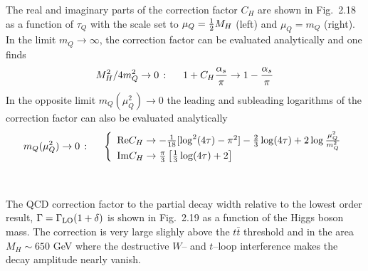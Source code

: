The real and imaginary parts of the correction factor $C_H$ are shown in 
Fig.~2.18 as a function of $\tau_Q$ with the scale set to $\mu_Q={1\over 2}
M_H$ (left) and $\mu_Q=m_Q$ (right). In the limit $m_Q \rightarrow \infty$, 
the correction factor can be evaluated analytically and one finds 
\cite{Hpp1loop}
\begin{eqnarray}
M_H^2/4m_Q^2 \to 0\,: \hspace{0.5cm} 1+
C_H \frac{\alpha_s}{\pi} \to  1 - \frac{\alpha_s}{\pi}
\end{eqnarray}
In the opposite limit $m_Q (\mu_Q^2) \rightarrow 0$ the leading and subleading
logarithms of the correction factor can also be evaluated analytically
\begin{equation}
m_Q(\mu_Q^2) \to 0\,: \hspace{0.5cm} \left\{
\begin{array}{l} {\rm Re} C_H \to -\frac{1}{18} [\log^2 (4\tau)-\pi^2] - 
\frac{2}{3} \log (4\tau) + 2\log\frac{\mu_Q^2}{m_Q^2} \\
{\rm Im} C_H \to \frac{\pi}{3} \left[ \frac{1}{3} \log(4\tau) + 2 \right]
\end{array} \right. 
\end{equation}

\begin{figure}[hbtp]
\vspace*{-1.2cm}
\hspace*{-1.7cm}
\centerline{
\hspace*{.9cm}
}\\[-1.cm]
\vspace*{-.1cm}
\end{figure}

The QCD correction factor to the partial decay width relative to the lowest
order result, $\Gamma=\Gamma_{\rm LO} (1+\delta)$ is shown in Fig.~2.19 as a
function of the Higgs boson mass.  The correction is very large slighly above
the $t\bar t$ threshold and in the area $M_H \sim 650$ GeV where the
destructive $W$-- and $t$--loop interference makes the decay amplitude nearly
vanish.  


